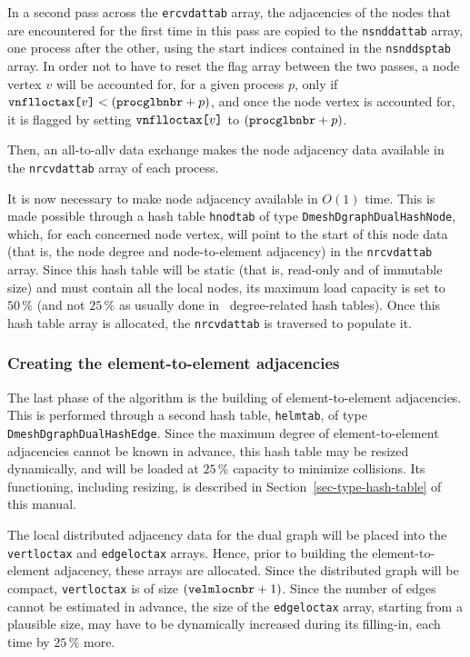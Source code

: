 In a second pass across the \texttt{ercv\lbt dat\lbt tab} array, the
adjacencies of the nodes that are encountered for the first time in
this pass are copied to the \texttt{nsnd\lbt dat\lbt tab} array, one
process after the other, using the start indices contained in the
\texttt{nsnd\lbt dsp\lbt tab} array. In order not to have to reset the
flag array between the two passes, a node vertex $v$ will be accounted
for, for a given process $p$, only if
$\texttt{vnfl\lbt loc\lbt tax[}v\texttt{]} <
(\texttt{proc\lbt glb\lbt nbr} + p)$, and once the node vertex is
accounted for, it is flagged by setting
$\texttt{vnfl\lbt loc\lbt tax[}v\texttt{]}$ to
$(\texttt{proc\lbt glb\lbt nbr} + p)$.

Then, an all-to-allv data exchange makes the node adjacency data
available in the \texttt{nrcv\lbt dat\lbt tab} array of each process.

It is now necessary to make node adjacency available in $O(1)$
time. This is made possible through a hash table \texttt{hnodtab} of
type \texttt{Dmesh\lbo Dgraph\lbt Dual\lbt Hash\lbo Node}, which, for
each concerned node vertex, will point to the start of this node data
(that is, the node degree and node-to-element adjacency) in the
\texttt{nrcv\lbt dat\lbt tab} array. Since this hash table will be
static (that is, read-only and of immutable size) and must contain all
the local nodes, its maximum load capacity is set to $50\,\%$
(and not $25\,\%$ as usually done in \scotch\ degree-related hash
tables). Once this hash table array is allocated, the
\texttt{nrcv\lbt dat\lbt tab} is traversed to populate it.

\subsubsection{Creating the element-to-element adjacencies}

The last phase of the algorithm is the building of element-to-element
adjacencies. This is performed through a second hash table,
\texttt{helmtab}, of type
\texttt{Dmesh\lbo Dgraph\lbt Dual\lbt Hash\lbo Edge}. Since the
maximum degree of element-to-element adjacencies cannot be known in
advance, this hash table may be resized dynamically, and will be
loaded at $25\,\%$ capacity to minimize collisions. Its functioning,
including resizing, is described in Section~\ref{sec-type-hash-table}
of this manual.

The local distributed adjacency data for the dual graph will be placed
into the \texttt{vert\lbt loc\lbt tax} and \texttt{edge\lbt loc\lbt tax}
arrays. Hence, prior to building the element-to-element adjacency,
these arrays are allocated. Since the distributed graph will be
compact, \texttt{vert\lbt loc\lbt tax} is of size
$(\texttt{velm\lbt loc\lbt nbr} + 1)$. Since the number of
edges cannot be estimated in advance, the size of the 
\texttt{edge\lbt loc\lbt tax} array, starting from a plausible size,
may have to be dynamically increased during its filling-in, each time
by $25\,\%$ more.

